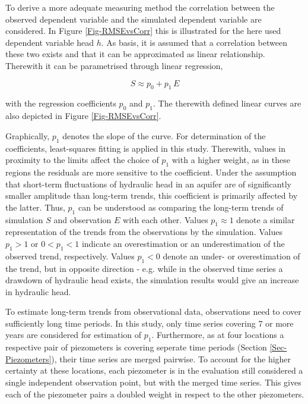 To derive a more adequate measuring method the correlation between the observed dependent variable and the simulated dependent variable are considered. In Figure \ref{Fig-RMSEvsCorr} this is illustrated for the here used dependent variable head $h$. As basis, it is assumed that a correlation between these two exists and that it can be approximated as linear relationship. Therewith it can be parametrised through linear regression,

\begin{equation}
    \label{Eq-ErrMethLinReg}
    S \approx p_0 + p_1 \, E
\end{equation}

\noindent with the regression coefficients $p_0$ and $p_1$. The therewith defined linear curves are also depicted in Figure \ref{Fig-RMSEvsCorr}.

Graphically, $p_1$ denotes the slope of the curve. For determination of the coefficients, least-squares fitting is applied in this study. Therewith, values in proximity to the limits affect the choice of $p_1$ with a higher weight, as in these regions the residuals are more sensitive to the coefficient. Under the assumption that short-term fluctuations of hydraulic head in an aquifer are of significantly smaller amplitude than long-term trends, this coefficient is primarily affected by the latter. Thus, $p_1$ can be understood as comparing the long-term trends of simulation $S$ and observation $E$ with each other. Values $p_1 \approx 1$ denote a similar representation of the trends from the observations by the simulation. Values $p_1 > 1$ or $0 < p_1 < 1$ indicate an overestimation or an underestimation of the observed trend, respectively. Values $p_1 < 0$ denote an under- or overestimation of the trend, but in opposite direction - e.g. while in the observed time series a drawdown of hydraulic head exists, the simulation results would give an increase in hydraulic head.


To estimate long-term trends from observational data, observations need to cover sufficiently long time periods. In this study, only time series covering 7 or more years are considered for estimation of $p_1$. Furthermore, as at four locations a respective pair of piezometers is covering seperate time periods (Section \ref{Sec-Piezometers}), their time series are merged pairwise. To account for the higher certainty at these locations, each piezometer is in the evaluation still considered a single independent observation point, but with the merged time series. This gives each of the piezometer pairs a doubled weight in respect to the other piezometers.

